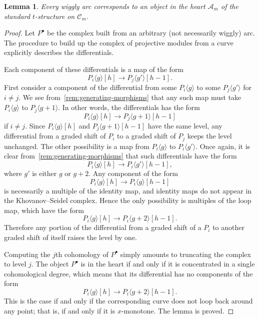 \documentclass{amsart}
\newtheorem{lemma}[theorem]{Lemma}
\theoremstyle{definition}
\begin{document}
\begin{lemma}
  Every wiggly arc corresponds to an object in the heart \(\mathcal{A}_m\) of the standard \(t\)-structure on \(\mathcal{C}_m\).
\end{lemma}
\begin{proof}
  Let \(P^{\bullet}\) be the complex built from an arbitrary (not necessarily wiggly) arc.
  The procedure to build up the complex of projective modules from a curve explicitly describes the differentials.  
  
  Each component of these differentials is a map of the form
  \[P_i\langle g \rangle[h] \to P_j\langle g' \rangle[h-1].\]
  First consider a component of the differential from some \(P_i\langle g \rangle\) to some \(P_j\langle g' \rangle\) for \(i \neq j\).
  We see from~\cref{rem:generating-morphisms} that any such map must take \(P_i\langle g \rangle\) to \(P_j \langle g+1 \rangle\).
  In other words, the differentials has the form
  \[P_i\langle g \rangle[h] \to P_j\langle g+1 \rangle[h-1]\]
  if \(i \neq j\).
  Since \(P_i\langle g \rangle[h]\) and \(P_j\langle g+1 \rangle[h-1]\) have the same level, any differential from a graded shift of \(P_i\) to a graded shift of \(P_j\) keeps the level unchanged.
  The other possibility is a map from \(P_i\langle g \rangle\) to \(P_i\langle g' \rangle\).
  Once again, it is clear from~\cref{rem:generating-morphisms} that such differentials have the form
  \[P_i \langle g \rangle[h] \to P_i\langle g' \rangle[h-1],\]
  where \(g'\) is either \(g\) or \(g + 2\).
  Any component of the form
  \[P_i \langle g \rangle[h] \to P_i\langle g \rangle[h-1]\]
  is necessarily a multiple of the identity map, and identity maps do not appear in the Khovanov--Seidel complex.
  Hence the only possibility is multiples of the loop map, which have the form
  \[P_i \langle g \rangle[h] \to P_i\langle g+2 \rangle[h-1].\]  
  Therefore any portion of the differential from a graded shift of a \(P_i\) to another graded shift of itself raises the level by one.

  Computing the \(j\)th cohomology of \(P^{\bullet}\) simply amounts to truncating the complex to level \(j\).
  The object \(P^{\bullet}\) is in the heart if and only if it is concentrated in a single cohomological degree, which means that its differential has no components of the form
  \[P_i \langle g \rangle[h] \to P_i\langle g+2 \rangle[h-1].\]
  This is the case if and only if the corresponding curve does not loop back around any point; that is, if and only if it is \(x\)-monotone.
  The lemma is proved.
\end{proof}
\end{document}
